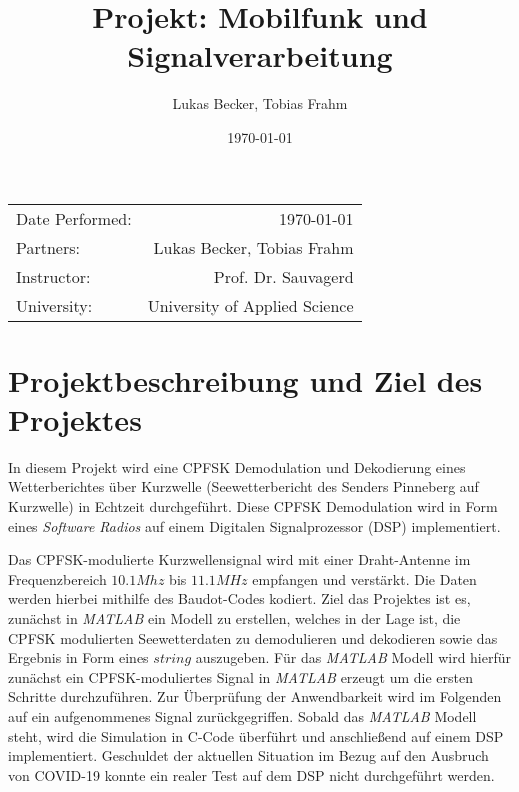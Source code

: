 \documentclass{article}
\title{Projekt: Mobilfunk und Signalverarbeitung} %
\author{Lukas Becker, Tobias Frahm} %
\date{\today} %
\begin{document}
\maketitle %

\begin{center}
\begin{tabular}{l r}
Date Performed: & \today \\ %
Partners: & Lukas Becker, Tobias Frahm \\ %
Instructor: & Prof. Dr. Sauvagerd \\%
University: & University of Applied Science 
\end{tabular}
\end{center}

\begin{acronym}
\end{acronym}



\section{Projektbeschreibung und Ziel des Projektes}

In diesem Projekt wird eine \ac{CPFSK} Demodulation und Dekodierung eines Wetterberichtes über Kurzwelle 
(Seewetterbericht des  Senders  Pinneberg  auf  Kurzwelle)  in  Echtzeit  durchgeführt. 
Diese  \ac{CPFSK} Demodulation  wird  in  Form  eines  \textit{Software  Radios}  auf  einem  
Digitalen Signalprozessor (DSP) implementiert. 

Das \ac{CPFSK}-modulierte Kurzwellensignal wird mit einer Draht-Antenne im Frequenzbereich
$10.1Mhz$ bis $11.1MHz$ empfangen und verstärkt. Die Daten werden hierbei mithilfe des Baudot-Codes kodiert. Ziel das Projektes ist es, zunächst in \textit{MATLAB} ein Modell zu erstellen, welches
in der Lage ist, die \ac{CPFSK} modulierten Seewetterdaten zu demodulieren und dekodieren sowie das Ergebnis in Form eines $string$ auszugeben. 
Für das \textit{MATLAB} Modell wird hierfür zunächst ein \ac{CPFSK}-moduliertes Signal in \textit{MATLAB} erzeugt um die ersten 
Schritte durchzuführen. Zur Überprüfung der Anwendbarkeit wird im Folgenden auf ein aufgenommenes Signal zurückgegriffen.
Sobald das \textit{MATLAB} Modell steht, wird die Simulation in C-Code überführt und anschließend 
auf einem DSP implementiert. Geschuldet der aktuellen Situation im Bezug auf den Ausbruch von COVID-19 konnte ein realer Test auf dem DSP nicht durchgeführt werden. 
\end{document}
